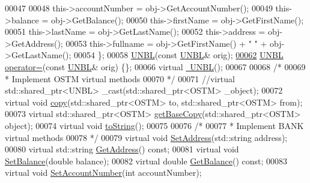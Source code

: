 \begin{DoxyCode}
00047  
00048         this->accountNumber = obj->GetAccountNumber();
00049         this->balance = obj->GetBalance();
00050         this->firstName = obj->GetFirstName();
00051         this->lastName = obj->GetLastName();
00052         this->address = obj->GetAddress();
00053         this->fullname = obj->GetFirstName() + \textcolor{stringliteral}{" "} + obj->GetLastName();
00054     \};
00058     \hyperlink{class_u_n_b_l_aa264ef64c453e6049b3d4c984d84d1de}{UNBL}(\textcolor{keyword}{const} \hyperlink{class_u_n_b_l}{UNBL}& orig);
\hypertarget{_u_n_b_l_8h_source.tex_l00062}{}\hyperlink{class_u_n_b_l_a32ab1105494f18bdb33e651e9bbfcd02}{00062}     \hyperlink{class_u_n_b_l}{UNBL} \hyperlink{class_u_n_b_l_a32ab1105494f18bdb33e651e9bbfcd02}{operator=}(\textcolor{keyword}{const} \hyperlink{class_u_n_b_l}{UNBL}& orig) \{\};
00066     \textcolor{keyword}{virtual} \hyperlink{class_u_n_b_l_a32d405e6e9adfab1ffdeec6406f9e72f}{~UNBL}();
00067     
00068     \textcolor{comment}{/*}
00069 \textcolor{comment}{     * Implement OSTM virtual methods}
00070 \textcolor{comment}{     */}
00071     \textcolor{comment}{//virtual std::shared\_ptr<UNBL> \_cast(std::shared\_ptr<OSTM> \_object);}
00072     \textcolor{keyword}{virtual} \textcolor{keywordtype}{void} \hyperlink{class_u_n_b_l_a14d5e1adc618827667d8d9524abaf31b}{copy}(std::shared\_ptr<OSTM> to, std::shared\_ptr<OSTM> from);
00073     \textcolor{keyword}{virtual} std::shared\_ptr<OSTM> \hyperlink{class_u_n_b_l_a5dfe7f9e5fbb66abff9a73e40e803887}{getBaseCopy}(std::shared\_ptr<OSTM> \textcolor{keywordtype}{object});
00074     \textcolor{keyword}{virtual} \textcolor{keywordtype}{void} \hyperlink{class_u_n_b_l_a76d8bba21d64d79d8de63763b8acc1fd}{toString}();
00075     
00076     \textcolor{comment}{/*}
00077 \textcolor{comment}{     * Implement BANK virtual methods}
00078 \textcolor{comment}{     */}
00079     \textcolor{keyword}{virtual} \textcolor{keywordtype}{void} \hyperlink{class_u_n_b_l_acbd63767c5070d82605671cfce0433a9}{SetAddress}(std::string address);
00080     \textcolor{keyword}{virtual} std::string \hyperlink{class_u_n_b_l_a74f8896be6e93ad8f89ca3b0da83525a}{GetAddress}() \textcolor{keyword}{const};
00081     \textcolor{keyword}{virtual} \textcolor{keywordtype}{void} \hyperlink{class_u_n_b_l_a3b7b2089cf4e2995e99b860b1fb2e5cb}{SetBalance}(\textcolor{keywordtype}{double} balance);
00082     \textcolor{keyword}{virtual} \textcolor{keywordtype}{double} \hyperlink{class_u_n_b_l_ad5b882bff8d1e2619b2ebbd170345c99}{GetBalance}() \textcolor{keyword}{const};
00083     \textcolor{keyword}{virtual} \textcolor{keywordtype}{void} \hyperlink{class_u_n_b_l_a0ee536d872c0f93486f942b268c2431e}{SetAccountNumber}(\textcolor{keywordtype}{int} accountNumber);

\end{DoxyCode}
